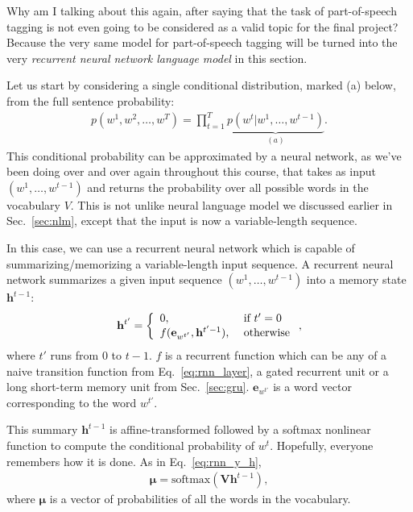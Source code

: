 \documentclass{report}
\newcommand{\softmax}{\text{softmax}}
\newcommand{\vect}[1]{\mathbf{#1}}
\newcommand{\vects}[1]{\boldsymbol{#1}}
\newcommand{\matr}[1]{\mathbf{#1}}
\newcommand{\ve}[0]{\vect{e}}
\newcommand{\vh}[0]{\vect{h}}
\newcommand{\mV}[0]{\matr{V}}
\newcommand{\vmu}[0]{\vects{\mu}}
\begin{document}
Why am I talking about this again, after saying that the task of part-of-speech
tagging is not even going to be considered as a valid topic for the final
project? Because the very same model for part-of-speech tagging will be turned
into the very {\em recurrent neural network language model} in this section.

Let us start by considering a single conditional distribution, marked (a) below,
from the full sentence probability:
\begin{align*}
    p(w^1, w^2, \ldots, w^T) = \prod_{t=1}^T \underbrace{p(w^t|w^1, \ldots,
    w^{t-1})}_{(a)}.
\end{align*}
This conditional probability can be approximated by a neural network, as we've
been doing over and over again throughout this course, that takes as input
$(w^1, \ldots, w^{t-1})$ and returns the probability over all possible words in
the vocabulary $V$.  This is not unlike neural language model we discussed
earlier in Sec.~\ref{sec:nlm}, except that the input is now a variable-length
sequence.

In this case, we can use a recurrent neural network which is capable of
summarizing/memorizing a variable-length input sequence.  A recurrent neural
network summarizes a given input sequence $(w^1, \ldots, w^{t-1})$ into a memory
state $\vh^{t-1}$:
\begin{align}
    \label{eq:rnnlm_iteration}
    \vh^{t'} = \left\{
        \begin{array}{l l}
            0,&\text{ if }t'=0 \\
            f(\ve_{w^{t'}}, \vh^{t'-1}),&\text{ otherwise}
        \end{array}
        \right.,
\end{align}
where $t'$ runs from $0$ to $t-1$.  $f$ is a recurrent function which can be any
of a naive transition function from Eq.~\eqref{eq:rnn_layer}, a gated recurrent
unit or a long short-term memory unit from Sec.~\ref{sec:gru}. $\ve_{w^{t'}}$ is
a word vector corresponding to the word $w^{t'}$.

This summary $\vh^{t-1}$ is affine-transformed followed by a softmax nonlinear
function to compute the conditional probability of $w^t$. Hopefully, everyone
remembers how it is done. As in Eq.~\eqref{eq:rnn_y_h}, 
\begin{align*}
    \vmu = \softmax(\mV \vh^{t-1}),
\end{align*}
where $\vmu$ is a vector of probabilities of all the words in the vocabulary.
\end{document}
